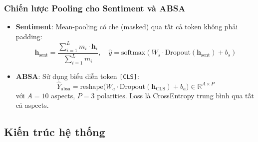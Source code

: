 \subsubsection{Chiến lược Pooling cho Sentiment và ABSA}

\begin{itemize}
    \item \textbf{Sentiment}: Mean-pooling có che (masked) qua tất cả token không phải padding:
    \begin{equation}
        \mathbf{h}_{\text{sent}} = \frac{\sum_{i=1}^{L} m_i \cdot \mathbf{h}_i}{\sum_{i=1}^{L} m_i}, \quad
        \hat{y} = \text{softmax}(W_s \cdot \text{Dropout}(\mathbf{h}_{\text{sent}}) + b_s)
    \end{equation}
    \item \textbf{ABSA}: Sử dụng biểu diễn token \texttt{[CLS]}:
    \begin{equation}
        \hat{Y}_{\text{absa}} = \text{reshape}\bigl(W_a \cdot \text{Dropout}(\mathbf{h}_{\text{CLS}}) + b_a\bigr) \in \mathbb{R}^{A \times P}
    \end{equation}
    với $A = 10$ aspects, $P = 3$ polarities. Loss là CrossEntropy trung bình qua tất cả aspects.
\end{itemize}

\subsection{Kiến trúc hệ thống}

